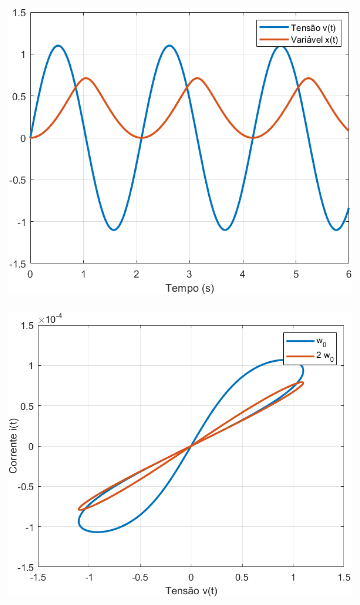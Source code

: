 \documentclass{ceel}
\begin{document}
\begin{multicols}{2}
\begin{figure}[ht]
\begin{subfigure}{0.315\textwidth}
\includegraphics[width=\columnwidth]{m-vt-xt}
\caption{} \label{vt:xt}
\end{subfigure}\hspace{0.25cm}
\begin{subfigure}{0.34\textwidth}
\includegraphics[width=\columnwidth]{ww0}
\caption{} \label{pinched}
\end{subfigure}


\end{figure}
\end{multicols}
\end{document}
